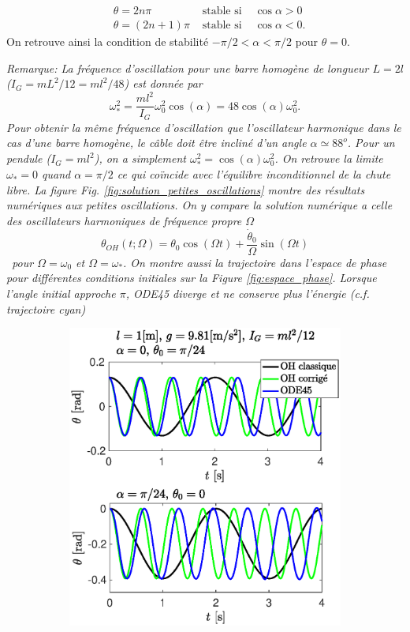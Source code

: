 \documentclass[11pt,a4paper]{exam}
\newcommand{\noteACDH}[1]{\textit{Remarque: #1}}
\begin{document}
\begin{parts}
    \begin{align}
        &\theta = 2n\pi   &\textrm{ stable si }& \cos\alpha > 0 \nonumber\\
        &\theta = (2n+1)\pi &\textrm{ stable si }& \cos\alpha < 0 \nonumber.
    \end{align}
    On retrouve ainsi la condition de stabilité $-\pi/2<\alpha<\pi/2$ pour $\theta=0$.
    \par
    \noteACDH{La fréquence d'oscillation pour une barre homogène de longueur $L=2l$ ($I_G=mL^2/12=ml^2/48$) est donnée par 
    $$\omega_*^2 = \frac{ml^2}{I_G} \omega_0^2\cos(\alpha) = 48\cos(\alpha) \omega_0^2. $$
    Pour obtenir la même fréquence d'oscillation que l'oscillateur harmonique dans le cas d'une barre homogène, le câble doit être incliné d'un angle  $\alpha\simeq 88^o$.
    Pour un pendule ($I_G = ml^2$), on a simplement $\omega_*^2=\cos(\alpha)\omega_0^2$.
    On retrouve la limite $\omega_*=0$ quand $\alpha=\pi/2$ ce qui coïncide avec l'équilibre inconditionnel de la chute libre.
     La figure Fig. \ref{fig:solution_petites_oscillations} montre des résultats numériques aux petites oscillations.
    On y compare la solution numérique a celle des oscillateurs harmoniques de fréquence  propre $\Omega$
    \begin{equation}
        \theta_{OH}(t;\Omega) =\theta_0\cos(\Omega t)+\frac{\dot\theta_0}{\Omega} \sin(\Omega t)
    \end{equation}\
    pour $\Omega=\omega_0$ et $\Omega=\omega_*$.
    On montre aussi la trajectoire dans l'espace de phase pour différentes conditions initiales sur la Figure \ref{fig:espace_phase}.
    Lorsque l'angle initial approche $\pi$, ODE45 diverge et ne conserve plus l'énergie (c.f. trajectoire cyan)}
    \begin{figure}
    \centering
    \begin{subfigure}{.45\textwidth}
      \centering
        \includegraphics[width=0.95\linewidth]{ExoFig/tyr_solution_petites_oscillations.eps}

\end{subfigure}
\end{figure}
\end{parts}
\end{document}
